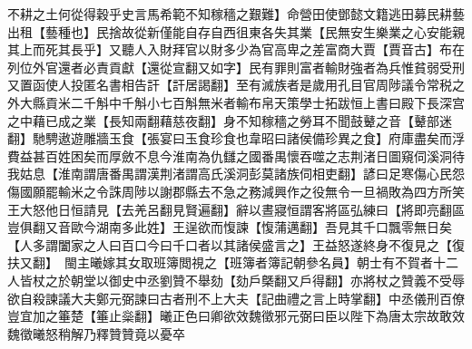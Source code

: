 不耕之土何從得穀乎史言馬希範不知稼穡之艱難】命營田使鄧懿文籍逃田募民耕藝出租【藝種也】民捨故從新僅能自存自西徂東各失其業【民無安生樂業之心安能親其上而死其長乎】又聽人入財拜官以財多少為官高卑之差富商大賈【賈音古】布在列位外官還者必責貢獻【還從宣翻又如字】民有罪則富者輸財強者為兵惟貧弱受刑又置函使人投匿名書相告訐【訐居謁翻】至有滅族者是歲用孔目官周陟議令常税之外大縣貢米二千斛中千斛小七百斛無米者輸布帛天策學士拓跋恒上書曰殿下長深宫之中藉已成之業【長知兩翻藉慈夜翻】身不知稼穡之勞耳不聞鼓鼙之音【鼙部迷翻】馳騁遨遊雕牆玉食【張宴曰玉食珍食也韋昭曰諸侯備珍異之食】府庫盡矣而浮費益甚百姓困矣而厚斂不息今淮南為仇讎之國番禺懷吞噬之志荆渚日圖窺伺溪洞待我姑息【淮南謂唐番禺謂漢荆渚謂高氏溪洞彭莫諸族伺相吏翻】諺曰足寒傷心民怨傷國願罷輸米之令誅周陟以謝郡縣去不急之務減興作之役無令一旦禍敗為四方所笑王大怒他日恒請見【去羌呂翻見賢遍翻】辭以晝寢恒謂客將區弘練曰【將即亮翻區豈俱翻又音歐今湖南多此姓】王逞欲而愎諫【愎蒲邁翻】吾見其千口飄零無日矣【人多謂闔家之人曰百口今曰千口者以其諸侯盛言之】王益怒遂終身不復見之【復扶又翻】　閩主曦嫁其女取班簿閲視之【班簿者簿記朝參名員】朝士有不賀者十二人皆杖之於朝堂以御史中丞劉贊不舉劾【劾戶槩翻又戶得翻】亦將杖之贊義不受辱欲自殺諫議大夫鄭元弼諫曰古者刑不上大夫【記曲禮之言上時掌翻】中丞儀刑百僚豈宜加之箠楚【箠止橤翻】曦正色曰卿欲效魏徵邪元弼曰臣以陛下為唐太宗故敢效魏徵曦怒稍解乃釋贊贊竟以憂卒

